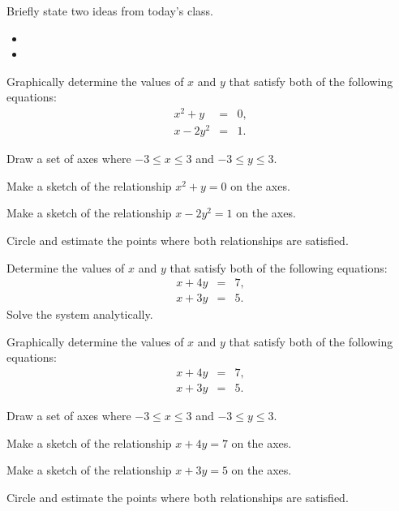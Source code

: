 \begin{problem}
\item Briefly state two ideas from today's class.
  \begin{itemize}
  \item
  \item
  \end{itemize}
\item Graphically determine the values of $x$ and $y$ that satisfy
  both of the following equations:
  \begin{eqnarray*}
    x^2 + y  & = & 0, \\
    x - 2y^2 & = & 1.
  \end{eqnarray*}

  \begin{subproblem}
  \item Draw a set of axes where $-3\leq x \leq 3$ and $-3 \leq y \leq
    3$.


    \vfill

  \item Make a sketch of the relationship $x^2+y=0$ on the axes.
  \item Make a sketch of the relationship $x-2y^2=1$ on the axes.
  \item Circle and estimate the points where both relationships are
    satisfied.
  \end{subproblem}
\clearpage
\item Determine the values of $x$ and $y$ that satisfy both of the
  following equations:
  \begin{eqnarray*}
    x + 4y & = & 7, \\
    x + 3y & = & 5.
  \end{eqnarray*}
  Solve the system analytically.
  \clearpage
\item Graphically determine the values of $x$ and $y$ that satisfy
  both of the following equations:
  \begin{eqnarray*}
    x + 4y & = & 7, \\
    x + 3y & = & 5.
  \end{eqnarray*}
  \begin{subproblem}
  \item Draw a set of axes where $-3\leq x \leq 3$ and $-3 \leq y \leq
    3$.


    \vfill

  \item Make a sketch of the relationship $x+4y=7$ on the axes.
  \item Make a sketch of the relationship $x+3y=5$ on the axes.
  \item Circle and estimate the points where both relationships are
    satisfied.
  \end{subproblem}
\end{problem}

